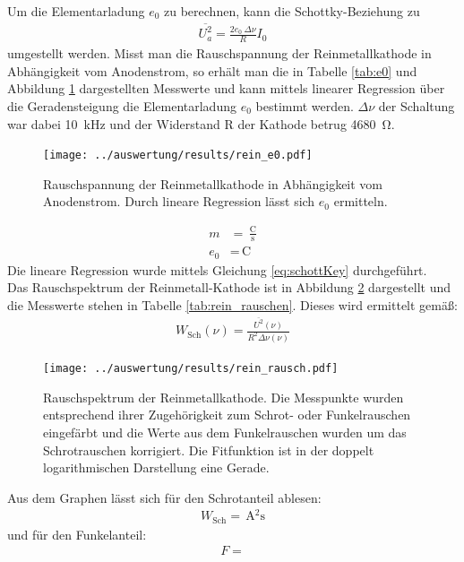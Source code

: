Um die Elementarladung $e_0$ zu berechnen, kann die Schottky-Beziehung zu
\begin{align}
	\overline{U_a^2} = \frac{2e_0 \ \Delta\nu}{R} I_0
	\label{eq:schottKey}
\end{align}
umgestellt werden. Misst man die Rauschspannung der Reinmetallkathode in Abhängigkeit vom Anodenstrom, so erhält man die in Tabelle \ref{tab:e0} und Abbildung \ref{fig:e0} dargestellten Messwerte und kann mittels linearer Regression über die Geradensteigung die Elementarladung $e_0$ bestimmt werden. $\Delta\nu$ der Schaltung war dabei \SI{10}{\kilo\hertz} und der Widerstand R der Kathode betrug \SI{4680}{\ohm}.
\begin{figure}[h]
	\texttt{[image: ../auswertung/results/rein\_e0.pdf]}
	\caption{Rauschspannung der Reinmetallkathode in Abhängigkeit vom Anodenstrom. Durch lineare Regression lässt sich $e_0$ ermitteln.}
	\label{fig:e0}
\end{figure}
\begin{align}
	m &= \, \frac{\si{\coulomb}}{\si{\second}}\\
	e_0 &= \, \si{\coulomb}
\end{align}
Die lineare Regression wurde mittels Gleichung \ref{eq:schottKey} durchgeführt.\\

Das Rauschspektrum der Reinmetall-Kathode ist in Abbildung \ref{fig:rauschspektrum} dargestellt und die Messwerte stehen in Tabelle \ref{tab:rein_rauschen}. Dieses wird ermittelt gemäß:
\begin{align}
	W_\text{Sch}(\nu) = \frac{\overline{U^2}(\nu)}{R^2 \Delta\nu(\nu)} 
\end{align}
\begin{figure}[h]
	\texttt{[image: ../auswertung/results/rein\_rausch.pdf]}
	\caption{Rauschspektrum der Reinmetallkathode. Die Messpunkte wurden entsprechend ihrer Zugehörigkeit zum Schrot- oder Funkelrauschen eingefärbt und die Werte aus dem Funkelrauschen wurden um das Schrotrauschen korrigiert. Die Fitfunktion ist in der doppelt logarithmischen Darstellung eine Gerade.}
	\label{fig:rauschspektrum}
\end{figure}
Aus dem Graphen lässt sich für den Schrotanteil ablesen:
\begin{align}
	W_\text{Sch} = \,\si{\ampere^2\second}
\end{align}
und für den Funkelanteil:
\begin{align}
F = 
\end{align}

